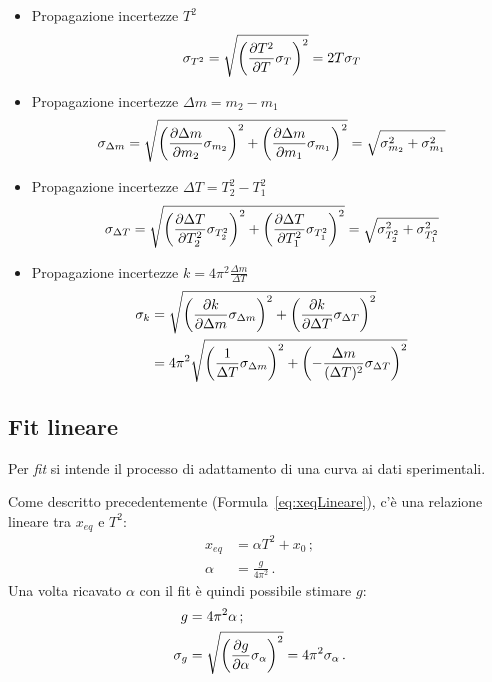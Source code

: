 \documentclass[titlepage]{article}
\numberwithin{equation}{section}
\numberwithin{figure}{section}
\numberwithin{table}{section}
\begin{document}
\begin{itemize}
  \item Propagazione incertezze $T^2$
    \begin{equation}
      \sigma_{T^2} = \sqrt{\left( \diffp{T^2}{T} \sigma_T \right)^2} = 2 T \sigma_T
    \end{equation}

  \item Propagazione incertezze $\Delta m = m_2 - m_1$
    \begin{equation}
      \sigma_{\Delta m} = \sqrt{\left( \diffp{\Delta m}{m_2} \sigma_{m_2} \right)^2 + \left( \diffp{\Delta m}{m_1} \sigma_{m_1} \right)^2}
      = \sqrt{\sigma_{m_2}^2 + \sigma_{m_1}^2}
    \end{equation}

  \item Propagazione incertezze $\Delta T = T^2_2 - T^2_1$
    \begin{equation}
      \sigma_{\Delta T} = \sqrt{\left( \diffp{\Delta T}{T^2_2} \sigma_{T^2_2} \right)^2 + \left( \diffp{\Delta T}{T^2_1} \sigma_{T^2_1} \right)^2}
      = \sqrt{\sigma_{T^2_2}^2 + \sigma_{T^2_1}^2}
    \end{equation}

  \item Propagazione incertezze $k = 4 \pi^2 \frac{\Delta m}{\Delta T}$
    \begin{align}
      \sigma_k &= \sqrt{\left( \diffp{k}{\Delta m} \sigma_{\Delta m} \right)^2 + \left( \diffp{k}{\Delta T} \sigma_{\Delta T} \right)^2} \nonumber \\
      &= 4 \pi^2 \sqrt{\left( \frac{1}{\Delta T} \sigma_{\Delta m} \right)^2 + \left( -\frac{\Delta m}{(\Delta T)^2} \sigma_{\Delta T} \right)^2} \nonumber \\
    \end{align}
\end{itemize}

\subsection{Fit lineare}

Per \textit{fit} si intende il processo di adattamento di una curva ai dati sperimentali.

\bigskip

\noindent
Come descritto precedentemente (Formula~\ref{eq:xeqLineare}), c'è una relazione lineare tra $x_{eq}$ e $T^2$:
\begin{align}
  x_{eq} &= \alpha T^2 + x_0 \,; \\
  \alpha &= \frac{g}{4 \pi^2} \,.
\end{align}
Una volta ricavato $\alpha$ con il fit è quindi possibile stimare $g$:
\begin{align}
  g &= 4 \pi^2 \alpha \,; \\
  \sigma_g &= \sqrt{\left( \diffp{g}{\alpha} \sigma_{\alpha} \right)^2} = 4 \pi^2 \sigma_{\alpha} \,.
\end{align}
\end{document}
